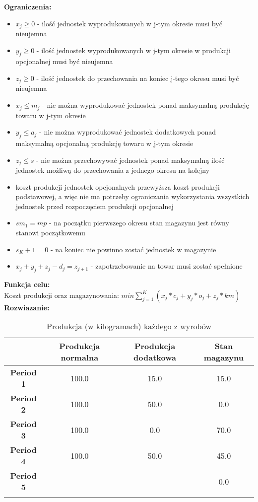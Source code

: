 \documentclass[15pt, a4paper]{article}
\begin{document}
\noindent\textbf{Ograniczenia:}

\begin{itemize}
    \item \(x_{j} \geq 0 \) - ilość jednostek wyprodukowanych w j-tym okresie musi być nieujemna
    \item \(y_{j} \geq 0 \) - ilość jednostek wyprodukowanych w j-tym okresie w produkcji opcjonalnej musi być nieujemna
    \item \(z_{j} \geq 0 \) - ilość jednostek do przechowania na koniec j-tego okresu musi być nieujemna
    \item \( x_{j} \leq m_j \) - nie można wyprodukować jednostek ponad maksymalną produkcję towaru w j-tym okresie     
    \item \( y_{j} \leq a_j\) - nie można wyprodukować jednostek dodatkowych ponad maksymalną opcjonalną produkcję towaru w j-tym okresie     
    \item \( z_j \leq s \) - nie można przechowywać jednostek ponad maksymalną ilość jednostek możliwą do przechowania z jednego okresu na kolejny
    \item koszt produkcji jednostek opcjonalnych przewyższa koszt produkcji podstawowej, a więc nie ma potrzeby ograniczania wykorzystania wszystkich jednostek przed rozpoczęciem produkcji opcjonalnej
    \item \( sm_1 = mp \) - na początku pierwszego okresu stan magazynu jest równy stanowi początkowemu 
    \item \( s_K+1 = 0 \) - na koniec nie powinno zostać jednostek w magazynie
    \item \( x_j + y_j + z_j - d_j = z_{j+1} \) - zapotrzebowanie na towar musi zostać spełnione
\end{itemize}

\noindent\textbf{Funkcja celu:}\\

Koszt produkcji oraz magazynowania: \(min \sum_{j=1}^{K}(x_{j} * c_{j} + y_{j} * o_{j} + z_{j} * km)\)\\

\noindent\textbf{Rozwiazanie:}\\ 

\begin{longtable}{|c|c|c|c|}
    \hline
    & \textbf{Produkcja normalna} & \textbf{Produkcja dodatkowa} & \textbf{Stan magazynu} \\ 
    \hline
    \textbf{Period 1} & 100.0 & 15.0 & 15.0 \\ 
    \hline
    \textbf{Period 2} & 100.0 & 50.0 & 0.0 \\ 
    \hline
    \textbf{Period 3} & 100.0 & 0.0 & 70.0 \\ 
    \hline
    \textbf{Period 4} & 100.0 & 50.0 & 45.0 \\ 
    \hline
    \textbf{Period 5} & & & 0.0 \\ 
    \hline
\caption{Produkcja (w kilogramach) każdego z wyrobów}
\end{longtable}
\end{document}
